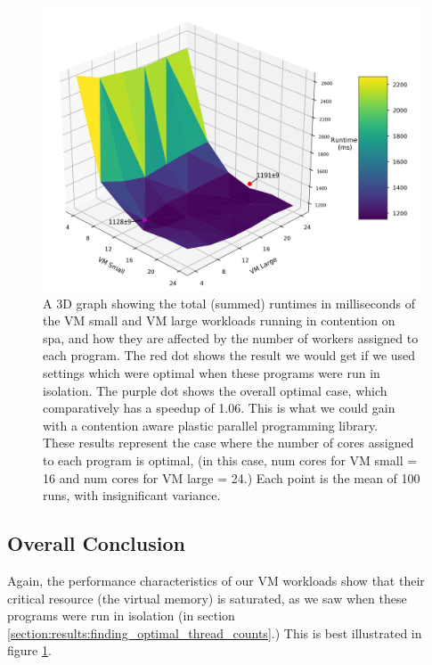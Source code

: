 \begin{figure}[H]
    \includegraphics[width=1\textwidth]{graphics/contention/spa/otwc_vm_small_and_vm_large.png}
    \caption{A 3D graph showing the total (summed) runtimes in milliseconds of the VM small and VM large workloads running in contention on spa, and how they are affected by the number of workers assigned to each program. The red dot shows the result we would get if we used settings which were optimal when these programs were run in isolation. The purple dot shows the overall optimal case, which comparatively has a speedup of 1.06. This is what we could gain with a contention aware plastic parallel programming library. \\
    These results represent the case where the number of cores assigned to each program is optimal, (in this case, num cores for VM small = 16 and num cores for VM large = 24.) Each point is the mean of 100 runs, with insignificant variance.}
    \label{fig:con_spa_vm_small_and_vm_large}
\end{figure}



\subsection{Overall Conclusion}
\label{section:results:overall_conclusion2}

Again, the performance characteristics of our VM workloads show that their critical resource (the virtual memory) is saturated, as we saw when these programs were run in isolation (in section \ref{section:results:finding_optimal_thread_counts}.) This is best illustrated in figure \ref{fig:con_spa_vm_small_and_vm_large}.


